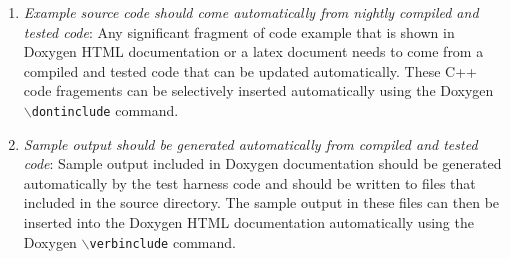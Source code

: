 \begin{enumerate}
{}\item\textit{Example source code should come automatically from nightly
compiled and tested code}: Any significant fragment of code example that is
shown in Doxygen HTML documentation or a latex document needs to come from a
compiled and tested code that can be updated automatically.  These C++ code
fragements can be selectively inserted automatically using the Doxygen
{}\texttt{$\backslash$dontinclude} command.

{}\item\textit{Sample output should be generated automatically from compiled
and tested code}: Sample output included in Doxygen documentation should be
generated automatically by the test harness code and should be written to
files that included in the source directory.  The sample output in these files
can then be inserted into the Doxygen HTML documentation automatically using
the Doxygen {}\texttt{$\backslash$verbinclude} command.

\end{enumerate}
